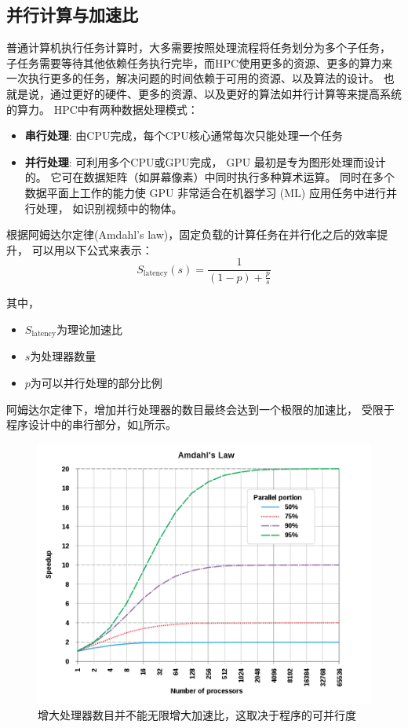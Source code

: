 \subsection{并行计算与加速比}
普通计算机执行任务计算时，大多需要按照处理流程将任务划分为多个子任务，
子任务需要等待其他依赖任务执行完毕，而HPC使用更多的资源、更多的算力来
一次执行更多的任务，解决问题的时间依赖于可用的资源、以及算法的设计。
也就是说，通过更好的硬件、更多的资源、以及更好的算法如并行计算等来提高系统的算力。
HPC中有两种数据处理模式\cite{amd_hpc}：

\begin{itemize}
    \item \textbf{串行处理}: 由CPU完成，每个CPU核心通常每次只能处理一个任务
    \item \textbf{并行处理}: 可利用多个CPU或GPU完成，
    GPU 最初是专为图形处理而设计的。
    它可在数据矩阵（如屏幕像素）中同时执行多种算术运算。
     同时在多个数据平面上工作的能力使 GPU 非常适合在机器学习 (ML) 应用任务中进行并行处理，
    如识别视频中的物体。
\end{itemize}

根据阿姆达尔定律(Amdahl's law)，固定负载的计算任务在并行化之后的效率提升，
可以用以下公式来表示\cite{wiki_amdahls_law}：
$$
S_\text{latency}(s) = \frac 1 {(1 - p) + \frac p s}
$$

其中，
\begin{itemize}
    \item $S_\text{latency}$为理论加速比
    \item $s$为处理器数量
    \item $p$为可以并行处理的部分比例
\end{itemize}

阿姆达尔定律下，增加并行处理器的数目最终会达到一个极限的加速比，
受限于程序设计中的串行部分，如\cref{amdahlslaw}所示。

\begin{figure}[ht!]
    \centering
    \includegraphics[width=\linewidth]{images/AmdahlsLaw.png}
    \caption{增大处理器数目并不能无限增大加速比，这取决于程序的可并行度}
    \label{amdahlslaw}
\end{figure}

